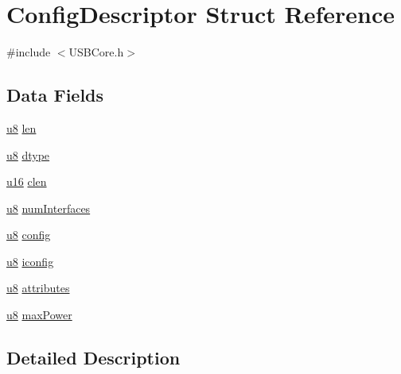 \hypertarget{struct_config_descriptor}{}\section{Config\+Descriptor Struct Reference}
\label{struct_config_descriptor}


{\ttfamily \#include $<$U\+S\+B\+Core.\+h$>$}

\subsection*{Data Fields}
\begin{DoxyCompactItemize}
\item 
\hyperlink{_u_s_b_a_p_i_8h_aed742c436da53c1080638ce6ef7d13de}{u8} \hyperlink{struct_config_descriptor_afbf3f3230446569534d5f466aaf4c23b}{len}
\item 
\hyperlink{_u_s_b_a_p_i_8h_aed742c436da53c1080638ce6ef7d13de}{u8} \hyperlink{struct_config_descriptor_a0bb419531ec75697e63e9109fecf81b0}{dtype}
\item 
\hyperlink{_u_s_b_a_p_i_8h_a9e6c91d77e24643b888dbd1a1a590054}{u16} \hyperlink{struct_config_descriptor_aa5da249d1d5f0d5206337b967ca02fc1}{clen}
\item 
\hyperlink{_u_s_b_a_p_i_8h_aed742c436da53c1080638ce6ef7d13de}{u8} \hyperlink{struct_config_descriptor_a14f358f5820bd4d472a16cbe4ca8cee9}{num\+Interfaces}
\item 
\hyperlink{_u_s_b_a_p_i_8h_aed742c436da53c1080638ce6ef7d13de}{u8} \hyperlink{struct_config_descriptor_afbc86c343de9cddaf950200827a9bceb}{config}
\item 
\hyperlink{_u_s_b_a_p_i_8h_aed742c436da53c1080638ce6ef7d13de}{u8} \hyperlink{struct_config_descriptor_aa15641f1c55e92825e8ba97b1dc504a1}{iconfig}
\item 
\hyperlink{_u_s_b_a_p_i_8h_aed742c436da53c1080638ce6ef7d13de}{u8} \hyperlink{struct_config_descriptor_a11c20ff21a3a4209dce65e2d537374bd}{attributes}
\item 
\hyperlink{_u_s_b_a_p_i_8h_aed742c436da53c1080638ce6ef7d13de}{u8} \hyperlink{struct_config_descriptor_a081afc2b5fe7d7e625c612cc09b17015}{max\+Power}
\end{DoxyCompactItemize}


\subsection{Detailed Description}


